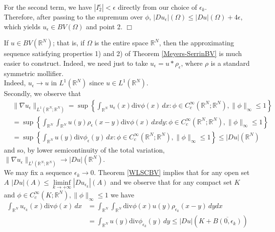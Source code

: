 For the second term, we have $|I_{2}^{\epsilon}| < \epsilon$ directly from our choice of $\epsilon_{k}$.
\\
Therefore, after passing to the supremum over $\phi$, $|Du_{\epsilon}|(\Omega) \le |Du|(\Omega) + 4 \epsilon$, which yields $u_{\epsilon} \in BV(\Omega)$ and point 2. $\Box$

\begin{remark} \label{BVR^N} If $u \in BV(\mathbb{R}^{N})$; that is, if $\Omega$ is the entire space $\mathbb{R}^{N}$, then the approximating sequence satisfying properties 1) and 2) of Theorem \ref{Meyers-SerrinBV} is much easier to construct. Indeed, we need just to take $u_{\epsilon} = u \ast \rho_{\epsilon}$, where $\rho$ is a standard symmetric mollifier.
\\
Indeed, $u_{\epsilon} \to u$ in $L^{1}(\mathbb{R}^{N})$ since $u \in L^{1}(\mathbb{R}^{N})$.
\\
Secondly, we observe that
\begin{align*} & \|\nabla u_{\epsilon}\|_{L^{1}(\mathbb{R}^{N}; \mathbb{R}^{N})} = \sup \left \{ \int_{\mathbb{R}^{N}} u_{\epsilon}(x) \mathrm{div}\phi(x) \, dx : \phi \in C^{\infty}_{c}(\mathbb{R}^{N}; \mathbb{R}^{N}), \|\phi\|_{\infty} \le 1 \right \} \\
& = \sup \left \{ \int_{\mathbb{R}^{N}} \int_{\mathbb{R}^{N}} u(y) \rho_{\epsilon}(x-y) \mathrm{div}\phi(x) \, dx dy : \phi \in C^{\infty}_{c}(\mathbb{R}^{N}; \mathbb{R}^{N}), \|\phi\|_{\infty} \le 1 \right \} \\
& = \sup \left \{ \int_{\mathbb{R}^{N}} u(y) \mathrm{div}\phi_{\epsilon}(y) \, dx : \phi \in C^{\infty}_{c}(\mathbb{R}^{N}; \mathbb{R}^{N}), \|\phi\|_{\infty} \le 1 \right \} \le |Du|(\mathbb{R}^{N}) \end{align*}
and so, by lower semicontinuity of the total variation, $\|\nabla u_{\epsilon}\|_{L^{1}(\mathbb{R}^{N}; \mathbb{R}^{N})} \to |Du|(\mathbb{R}^{N})$.
\\
We may fix a sequence $\epsilon_{k} \to 0$. Theorem \ref{WLSCBV} implies that for any open set $A$ $|D u|(A) \le \liminf\limits_{k \to +\infty} |D u_{\epsilon_{k}}|(A)$ and we observe that for any compact set $K$ and $\phi \in C^{\infty}_{c}(K; \mathbb{R}^{N}), \|\phi\|_{\infty} \le 1$ we have
\begin{align*} \int_{\mathbb{R}^{N}} u_{\epsilon_{k}}(x) \mathrm{div}\phi(x) \, dx & = \int_{\mathbb{R}^{N}} \int_{\mathbb{R}^{N}} \mathrm{div}\phi(x) u(y)  \rho_{\epsilon_{k}}(x - y) \, dy dx \\
& = \int_{\mathbb{R}^{N}} u(y) \mathrm{div}\phi_{\epsilon_{k}}(y) \, dy \le |D u|(K + \overline{B(0, \epsilon_{k})})

\end{align*}
\end{remark}
